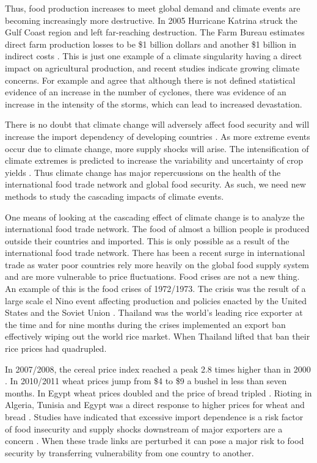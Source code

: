 Thus, food production increases to meet global demand and climate events are becoming increasingly more destructive. In 2005 Hurricane Katrina struck the Gulf Coast region and left far-reaching destruction. The Farm Bureau estimates direct farm production losses to be \$1 billion dollars and another \$1 billion in indirect costs \citep{schnepf2005us}. This is just one example of a climate singularity having a direct impact on agricultural production, and recent studies indicate growing climate concerns. For example \cite{webster2005changes} and \cite{trenberth2005uncertainty} agree that although there is not defined statistical evidence of an increase in the number of cyclones, there was evidence of an increase in the intensity of the storms, which can lead to increased devastation.\par
There is no doubt that climate change will adversely affect food security and will increase the import dependency of developing countries \citep{schmidhuber2007global}. As more extreme events occur due to climate change, more supply shocks will arise. The intensification of climate extremes is predicted to increase the variability and uncertainty of crop yields \citep{stocker2013climate}. Thus climate change has major repercussions on the health of the international food trade network and global food security. As such, we need new methods to study the cascading impacts of climate events.\par
One means of looking at the cascading effect of climate change is to analyze the international food trade network. The food of almost a billion people is produced outside their countries \citep{fader2013spatial} and imported. This is only possible as a result of the international food trade network. There has been a recent surge in international trade as water poor countries rely more heavily on the global food supply system and are more vulnerable to price fluctuations. Food crises are not a new thing. An example of this is the food crises of 1972/1973. The crisis was the result of a large scale el Nino event affecting production and policies enacted by the United States and the Soviet Union \citep{timmer2010reflections}. Thailand was the world's leading rice exporter at the time and for nine months during the crises implemented an export ban effectively wiping out the world rice market. When Thailand lifted that ban their rice prices had quadrupled.\par
In 2007/2008, the cereal price index reached a peak 2.8 times higher than in 2000 \citep{globalFoodCrises}. In 2010/2011 wheat prices jump from \$4 to \$9 a bushel in less than seven months. In Egypt wheat prices doubled and the price of bread tripled \citep{sternberg2012chinese}. Rioting in Algeria, Tunisia and Egypt was a direct response to higher prices for wheat and bread \citep{johnstone2011global}. Studies have indicated that excessive import dependence is a risk factor of food insecurity \citep{fader2013spatial} and supply shocks downstream of major exporters are a concern \citep{gephart2016vulnerability}. When these trade links are perturbed it can pose a major risk to food security by transferring vulnerability from one country to another.\par
